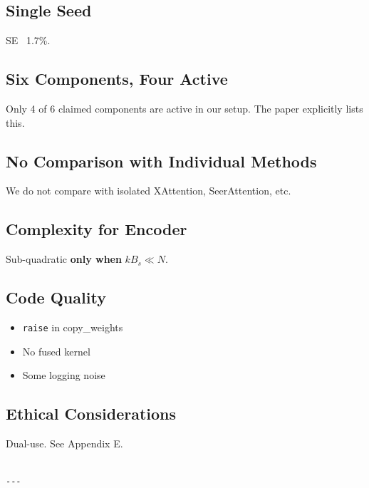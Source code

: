 \subsection{Single Seed}

SE ~1.7\%.

\subsection{Six Components, Four Active}

Only 4 of 6 claimed components are active in our setup. The paper 
explicitly lists this.

\subsection{No Comparison with Individual Methods}

We do not compare with isolated XAttention, SeerAttention, etc.

\subsection{Complexity for Encoder}

Sub-quadratic \textbf{only when} $k B_s \ll N$.

\subsection{Code Quality}

\begin{itemize}
\item \texttt{raise} in copy\_weights
\item No fused kernel
\item Some logging noise

\end{itemize}
\subsection{Ethical Considerations}

Dual-use. See Appendix E.
\begin{lstlisting}

---
\end{lstlisting}